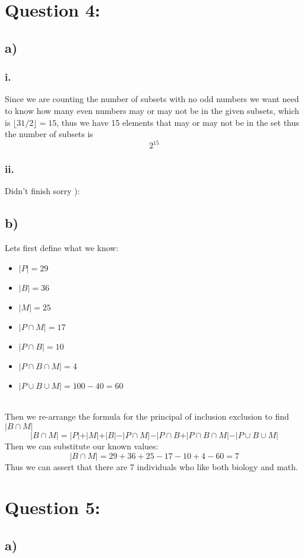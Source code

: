 \documentclass{article}
\begin{document}
\section*{Question 4:}
\subsection*{a)}
\subsubsection*{i.}
Since we are counting the number of subsets with no odd numbers we want need to know how many even numbers may or may not be in the given subsets, which is $\lfloor 31/2 \rfloor = 15$, thus we have 15 elements that may or may not be in the set thus the number of subsets is $$2^{15}$$
\subsubsection*{ii.}
Didn't finish sorry ):

\newpage
\subsection*{b)}
Lets first define what we know:
\begin{itemize}
    \item $\vert P \vert=29$
    \item $\vert B \vert=36$
    \item $\vert M \vert=25$
    \item $\vert P \cap M\vert = 17$
    \item $\vert P\cap B\vert = 10$
    \item $\vert P\cap B\cap M\vert =4$
    \item $\vert P\cup B\cup M\vert =100-40=60$
\end{itemize} \\
Then we re-arrange the formula for the principal of inclusion exclusion to find $\vert B\cap M\vert$ $$\vert B \cap M\vert = \vert P\vert + \vert M\vert +\vert B\vert -\vert P\cap M\vert -\vert P\cap B+\vert P \cap B\cap M\vert -\vert P\cup B\cup M\vert $$
Then we can substitute our known values:$$\vert B\cap M\vert =29+36+25-17-10+4-60=7$$
Thus we can assert that there are 7 individuals who like both biology and math.\newpage
\section*{Question 5:}
\subsection*{a)}
\end{document}
